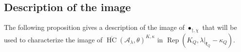 \documentclass[12pt]{amsart}
\newcommand{\A}{\mathcal{A}}
\newcommand{\Orb}{\mathbb{O}}
\newcommand{\kf}{\mathfrak{k}}
\newcommand{\HC}{\operatorname{HC}}
\newcommand{\TT}{\mathscr{T}}
\theoremstyle{definition}
\newtheorem{Rem}[Thm]{Remark}
\numberwithin{equation}{section}
\begin{document}
%


\subsection{Description of the image}\label{SS_image_description}
The following proposition gives a description of the image of $\bullet_{\dagger,\chi}$
that will be used to characterize the image of
$\overline{\HC}(\A_\lambda,\theta)^{K,\kappa}$ in $\operatorname{Rep}(K_Q,\lambda|_{\kf_Q}-\kappa_Q)$.
\end{document}
